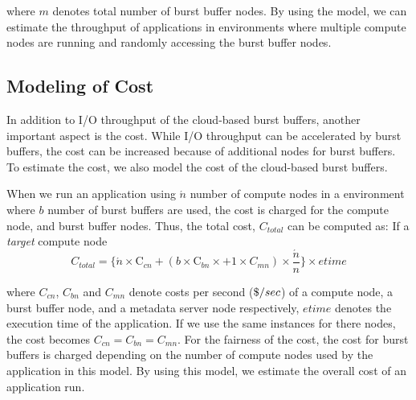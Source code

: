 where $m$ denotes total number of burst buffer nodes. 
By using the model, we can estimate the throughput of applications in
environments where multiple compute nodes are running and randomly accessing the
burst buffer nodes.

\subsection{Modeling of Cost}
In addition to I/O throughput of the cloud-based burst buffers, another
important aspect is the cost.
While I/O throughput can be accelerated by burst buffers, the cost can be
increased because of additional nodes for burst buffers.
To estimate the cost, we also model the cost of the cloud-based burst buffers.

When we run an application using $\acute{n}$ number of compute nodes in a
environment where $b$ number of burst buffers are used, the cost is charged for
the compute node, and burst buffer nodes.
Thus, the total cost, $C_{total}$ can be computed as:   If a \emph{target}
compute node
\begin{equation}
C_{total} = \{　\acute{n} \times \text{C}_{cn}+ (b \times \text{C}_{bn} \times
 + 1 \times C_{mn}) \times \frac{\acute{n}}{n} \}\times etime
\end{equation}

where $C_{cn}$, $C_{bn}$ and $C_{mn}$ denote costs per second (${\it \$} /sec$)
of a compute node, a burst buffer node, and a metadata server node
respectively, $etime$ denotes the execution time of the application. If we
use the same instances for there nodes, the cost becomes 
$C_{cn}=C_{bn}=C_{mn}$.
For the fairness of the cost, the cost for burst buffers is charged depending on the number of compute nodes used by the application in this model. By using this
model, we estimate the overall cost of an application run. 


